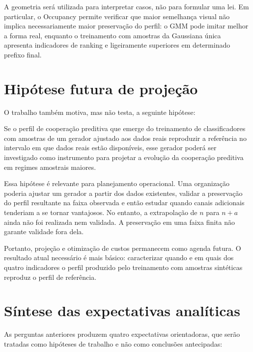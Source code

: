 A geometria será utilizada para interpretar casos, não para formular uma lei. Em particular, o Occupancy permite verificar que maior semelhança visual não implica necessariamente maior preservação do perfil: o GMM pode imitar melhor a forma real, enquanto o treinamento com amostras da Gaussiana única apresenta indicadores de ranking e \WinnersAgreement{} ligeiramente superiores em determinado prefixo final.

\section{Hipótese futura de projeção}

O trabalho também motiva, mas não testa, a seguinte hipótese:

\begin{researchquestionbox}
Se o perfil de cooperação preditiva que emerge do treinamento de classificadores com amostras de um gerador ajustado aos dados reais reproduzir a referência no intervalo em que dados reais estão disponíveis, esse gerador poderá ser investigado como instrumento para projetar a evolução da cooperação preditiva em regimes amostrais maiores.
\end{researchquestionbox}

Essa hipótese é relevante para planejamento operacional. Uma organização poderia ajustar um gerador a partir dos dados existentes, validar a preservação do perfil resultante na faixa observada e então estudar quando canais adicionais tenderiam a se tornar vantajosos. No entanto, a extrapolação de $n$ para $n+a$ ainda não foi realizada nem validada. A preservação em uma faixa finita não garante validade fora dela.

Portanto, projeção e otimização de custos permanecem como agenda futura. O resultado atual necessário é mais básico: caracterizar quando e em quais dos quatro indicadores o perfil produzido pelo treinamento com amostras sintéticas reproduz o perfil de referência.

\section{Síntese das expectativas analíticas}

As perguntas anteriores produzem quatro expectativas orientadoras, que serão tratadas como hipóteses de trabalho e não como conclusões antecipadas:

